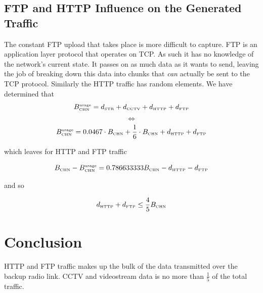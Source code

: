 \documentclass[a4paper]{scrreprt}
\begin{document}
			\subsection{FTP and HTTP Influence on the Generated Traffic}\label{sec:ftpinfluence}
			The constant FTP upload that takes place is more difficult to capture. FTP is an application layer protocol that operates on TCP. As such it has no knowledge of the network's current state. It passes on as much data as it wants to send, leaving the job of breaking down this data into chunks that \emph{can} actually be sent to the TCP protocol. 										
			Similarly the HTTP traffic has random elements. We have determined that
			\[B_\text{\tiny CHN}^\text{\tiny usage} = d_\text{\tiny STR}+d_\text{\tiny CCTV}+d_\text{\tiny HTTP}+d_\text{\tiny FTP}\]
			\[\Leftrightarrow\]
			\[B_\text{\tiny CHN}^\text{\tiny usage} = 0.0467\cdot B_\text{\tiny CHN} + \frac{1}{6}\cdot B_\text{\tiny CHN} + d_\text{\tiny HTTP} + d_\text{\tiny FTP}\]
			
			which leaves for HTTP and FTP traffic
			
			\[B_\text{\tiny CHN}-B_\text{\tiny CHN}^\text{\tiny usage}=0.786633333B_\text{\tiny CHN} - d_\text{\tiny HTTP} - d_\text{\tiny FTP}\]
			
			and so
			
			\[d_\text{\tiny HTTP} + d_\text{\tiny FTP}\leq \frac{4}{5}B_\text{\tiny CHN}\]					
			
%			

		 \section{Conclusion}
		 	HTTP and FTP traffic makes up the bulk of the data transmitted over the backup radio link. CCTV and videostream data is no more than $\frac{1}{5}$ of the total traffic. 
		 	
\end{document}
